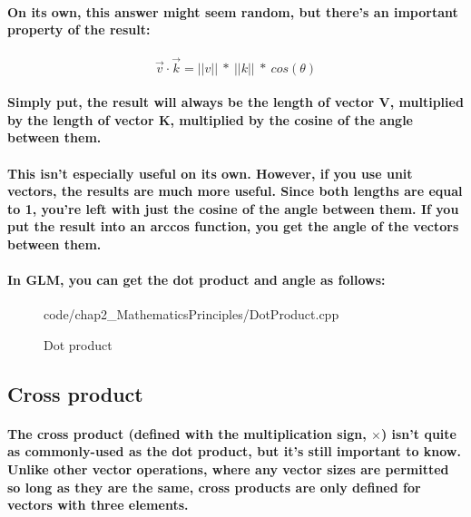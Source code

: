 \paragraph{
    On its own, this answer might seem random, but there's an important property of the result:
}

\paragraph{
    \begin{equation*}
    \vec{v} \cdotp \vec{k} =||v||\ *\ ||k||\ *\ cos( \theta )
    \end{equation*}
}

\paragraph{
    Simply put, the result will always be the length of vector V, multiplied by the length of vector K, multiplied by the cosine of the angle between them.
}

\paragraph{
    This isn't especially useful on its own. However, if you use unit vectors, the results are much more useful. Since both lengths are equal to 1, you're left with just the cosine of the angle between them. If you put the result into an arccos function, you get the angle of the vectors between them.
}

\paragraph{
    In GLM, you can get the dot product and angle as follows:
}

\begin{frame}{}
    \begin{figure}[ht]
    \centering
    \colorbox{backgroundcolor}{
        \parbox{0.9\textwidth}{
            
            {code/chap2_MathematicsPrinciples/DotProduct.cpp}
        }
    }
    \caption{Dot product}
    \label{fig:dot_product}
    \end{figure}
\end{frame}

\subsection{Cross product}
\paragraph{
    The cross product (defined with the multiplication sign, $\times$) isn't quite as commonly-used as the dot product, but it's still important to know. Unlike other vector operations, where any vector sizes are permitted so long as they are the same, cross products are only defined for vectors with three elements.
}

